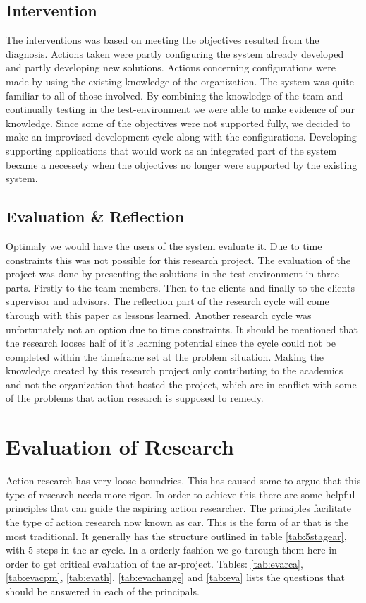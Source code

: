 \subsection{Intervention}
The interventions was based on meeting the objectives resulted from the diagnosis. 
Actions taken were partly configuring the system already developed and partly developing new solutions.
Actions concerning configurations were made by using the existing knowledge of the organization.
The system was quite familiar to all of those involved.
By combining the knowledge of the team and continually testing in the test-environment we were able to make evidence of our knowledge.
Since some of the objectives were not supported fully, we decided to make an improvised development cycle along with the configurations. 
Developing supporting applications that would work as an integrated part of the system became a necessety when the objectives no longer were supported by the existing system.
\subsection{Evaluation \& Reflection}
Optimaly we would have the users of the system evaluate it. 
Due to time constraints this was not possible for this research project. 
The evaluation of the project was done by presenting the solutions in the test environment in three parts.
Firstly to the team members. Then to the clients and finally to the clients supervisor and advisors.
The reflection part of the research cycle will come through with this paper as lessons learned.
Another research cycle was unfortunately not an option due to time constraints.
It should be mentioned that the research looses half of it's learning potential since the cycle could not be completed within the timeframe set at the problem situation. 
Making the knowledge created by this research project only contributing to the academics and not the organization that hosted the project, which are in conflict with some of the problems that action research is supposed to remedy.

\section{Evaluation of Research}
Action research has very loose boundries. 
This has caused some to argue that this type of research needs more rigor. 
In order to achieve this there are some helpful principles that can guide the aspiring action researcher. 
The prinsiples facilitate the type of action research now known as \gls{car}.
This is the form of \gls{ar} that is the most traditional. 
It generally has the structure outlined in table \ref{tab:5stagear}, with 5 steps in the \gls{ar} cycle.
In a orderly fashion we go through them here in order to get critical evaluation of the \gls{ar}-project. 
Tables: \ref{tab:evarca}, \ref{tab:evacpm}, \ref{tab:evath}, \ref{tab:evachange} and \ref{tab:eva} lists the questions that should be answered in each of the principals.

